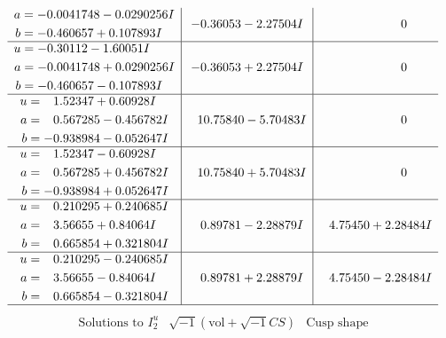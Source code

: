 \documentclass[1p]{elsarticle_modified}
\theoremstyle{definition}
\newcommand{\I}{\sqrt{-1}}
\begin{document}
$$\begin{array}{c|c|c}
\begin{aligned}
a &= -0.0041748 - 0.0290256 I \\
b &= -0.460657 + 0.107893 I\end{aligned}
 & -0.36053 - 2.27504 I & \phantom{-0.000000 } 0 \\ \hline\begin{aligned}
u &= -0.30112 - 1.60051 I \\
a &= -0.0041748 + 0.0290256 I \\
b &= -0.460657 - 0.107893 I\end{aligned}
 & -0.36053 + 2.27504 I & \phantom{-0.000000 } 0 \\ \hline\begin{aligned}
u &= \phantom{-}1.52347 + 0.60928 I \\
a &= \phantom{-}0.567285 - 0.456782 I \\
b &= -0.938984 - 0.052647 I\end{aligned}
 & \phantom{-}10.75840 - 5.70483 I & \phantom{-0.000000 } 0 \\ \hline\begin{aligned}
u &= \phantom{-}1.52347 - 0.60928 I \\
a &= \phantom{-}0.567285 + 0.456782 I \\
b &= -0.938984 + 0.052647 I\end{aligned}
 & \phantom{-}10.75840 + 5.70483 I & \phantom{-0.000000 } 0 \\ \hline\begin{aligned}
u &= \phantom{-}0.210295 + 0.240685 I \\
a &= \phantom{-}3.56655 + 0.84064 I \\
b &= \phantom{-}0.665854 + 0.321804 I\end{aligned}
 & \phantom{-}0.89781 - 2.28879 I & \phantom{-}4.75450 + 2.28484 I \\ \hline\begin{aligned}
u &= \phantom{-}0.210295 - 0.240685 I \\
a &= \phantom{-}3.56655 - 0.84064 I \\
b &= \phantom{-}0.665854 - 0.321804 I\end{aligned}
 & \phantom{-}0.89781 + 2.28879 I & \phantom{-}4.75450 - 2.28484 I\\
 \hline 
 \end{array}$$\newpage$$\begin{array}{c|c|c}  
\text{Solutions to }I^u_{2}& \I (\text{vol} + \sqrt{-1}CS) & \text{Cusp shape}\\
 \hline 
\begin{aligned}

\end{aligned}
\end{array}$$
\end{document}

